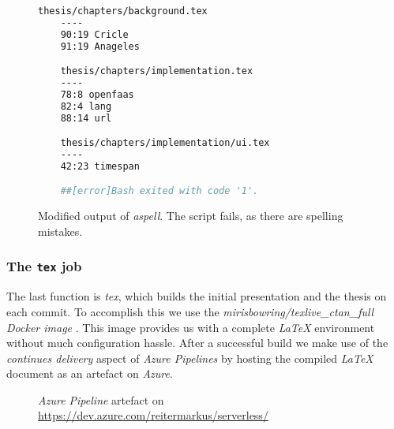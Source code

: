 \begin{figure}[H]
  \begin{lstlisting}[language=bash, basicstyle=\footnotesize\ttfamily]
    thesis/chapters/background.tex
    ----
    90:19 Cricle
    91:19 Anageles

    thesis/chapters/implementation.tex
    ----
    78:8 openfaas
    82:4 lang
    88:14 url

    thesis/chapters/implementation/ui.tex
    ----
    42:23 timespan

    ##[error]Bash exited with code '1'.
  \end{lstlisting}
  \caption{Modified output of \textit{aspell}. The script fails, as there are spelling mistakes.}
\end{figure}

\subsubsection{The \texttt{tex} job}

The last function is \textit{tex}, which builds the initial presentation and the thesis on each
commit. To accomplish this we use the \textit{mirisbowring/texlive\_ctan\_full Docker image}
\cite{tex-hub}. This image provides us with a complete \textit{LaTeX} environment without much
configuration hassle. After a successful build we make use of the \textit{continues delivery} aspect
of \textit{Azure Pipelines} by hosting the compiled \textit{LaTeX} document as an artefact on
\textit{Azure}.

\begin{figure}[H]
  \centering
  \caption{\textit{Azure Pipeline} artefact on \url{https://dev.azure.com/reitermarkus/serverless/}}
\end{figure}
